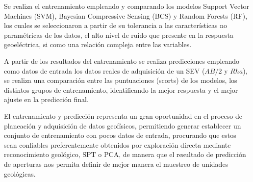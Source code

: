  
Se realiza el entrenamiento empleando y comparando los modelos Support Vector Machines (SVM), Bayesian Compressive Sensing (BCS) y Random Forests (RF), los cuales se  seleccionaron a partir de su tolerancia a las características no paramétricas de los datos, el alto nivel de ruido que presente en la respuesta geoeléctrica, si como una relación compleja entre las variables.%

A partir de los resultados del entrenamiento se realiza predicciones empleando como datos de entrada los datos reales de adquisición de un SEV ($AB/2$ y $Rha$),  se realiza una comparación entre las puntuaciones (scorts) de los modelos, los distintos grupos de entrenamiento, identificando la mejor respuesta y el mejor ajuste en la predicción final.

El entrenamiento y predicción representa un gran oportunidad en el proceso de planeación y adquisición de datos geofísicos, permitiendo generar establecer un conjunto de entrenamiento con pocos datos de entrada, procurando que estos sean confiables preferentemente obtenidos por exploración directa mediante reconocimiento geológico, SPT o PCA, de manera que el resultado de predicción de aperturas nos permita definir de mejor manera el muestreo de unidades geológicas. 











